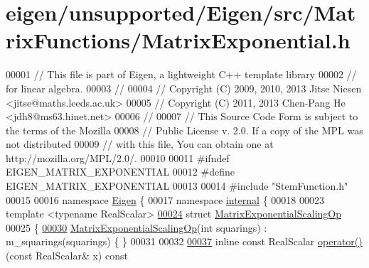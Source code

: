 \hypertarget{eigen_2unsupported_2_eigen_2src_2_matrix_functions_2_matrix_exponential_8h_source}{}\section{eigen/unsupported/\+Eigen/src/\+Matrix\+Functions/\+Matrix\+Exponential.h}
\label{eigen_2unsupported_2_eigen_2src_2_matrix_functions_2_matrix_exponential_8h_source}

\begin{DoxyCode}
00001 \textcolor{comment}{// This file is part of Eigen, a lightweight C++ template library}
00002 \textcolor{comment}{// for linear algebra.}
00003 \textcolor{comment}{//}
00004 \textcolor{comment}{// Copyright (C) 2009, 2010, 2013 Jitse Niesen <jitse@maths.leeds.ac.uk>}
00005 \textcolor{comment}{// Copyright (C) 2011, 2013 Chen-Pang He <jdh8@ms63.hinet.net>}
00006 \textcolor{comment}{//}
00007 \textcolor{comment}{// This Source Code Form is subject to the terms of the Mozilla}
00008 \textcolor{comment}{// Public License v. 2.0. If a copy of the MPL was not distributed}
00009 \textcolor{comment}{// with this file, You can obtain one at http://mozilla.org/MPL/2.0/.}
00010 
00011 \textcolor{preprocessor}{#ifndef EIGEN\_MATRIX\_EXPONENTIAL}
00012 \textcolor{preprocessor}{#define EIGEN\_MATRIX\_EXPONENTIAL}
00013 
00014 \textcolor{preprocessor}{#include "StemFunction.h"}
00015 
00016 \textcolor{keyword}{namespace }\hyperlink{namespace_eigen}{Eigen} \{
00017 \textcolor{keyword}{namespace }\hyperlink{namespaceinternal}{internal} \{
00018 
00023 \textcolor{keyword}{template} <\textcolor{keyword}{typename} RealScalar>
\hyperlink{struct_eigen_1_1internal_1_1_matrix_exponential_scaling_op}{00024} \textcolor{keyword}{struct }\hyperlink{struct_eigen_1_1internal_1_1_matrix_exponential_scaling_op}{MatrixExponentialScalingOp}
00025 \{
\hyperlink{struct_eigen_1_1internal_1_1_matrix_exponential_scaling_op_afb0f3ee7d324e315d1e1233f70110438}{00030}   \hyperlink{struct_eigen_1_1internal_1_1_matrix_exponential_scaling_op_afb0f3ee7d324e315d1e1233f70110438}{MatrixExponentialScalingOp}(\textcolor{keywordtype}{int} squarings) : m\_squarings(squarings) \{ \}
00031 
00032 
\hyperlink{struct_eigen_1_1internal_1_1_matrix_exponential_scaling_op_ad4c95fe9fcbf59981c2a5a0a4e42041d}{00037}   \textcolor{keyword}{inline} \textcolor{keyword}{const} RealScalar \hyperlink{struct_eigen_1_1internal_1_1_matrix_exponential_scaling_op_ad4c95fe9fcbf59981c2a5a0a4e42041d}{operator() }(\textcolor{keyword}{const} RealScalar& x)\textcolor{keyword}{ const}

\end{DoxyCode}
